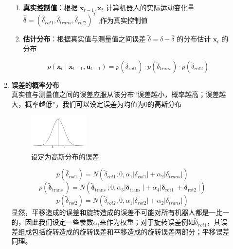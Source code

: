\documentclass[../main.tex]{subfiles}
\begin{document}
\begin{enumerate}
\begin{enumerate}
\begin{enumerate}
                \item \textbf{真实控制值}：根据 \( {\mathbf{x}}_{t - 1},{\mathbf{x}}_{t} \) 计算机器人的实际运动变化量 \( \widehat{\mathbf{\delta }} = {\left( {\widehat{\delta }}_{rot1},{\widehat{\delta }}_{trans},{\widehat{\delta }}_{rot2}\right) }^{T} \) ,作为真实控制值           
                \item \textbf{估计分布}：根据真实值与测量值之间误差 \( \widetilde{\delta } = \delta  - \widehat{\delta } \) 的分布估计 \( {\mathbf{x}}_{t} \) 的分布
                
                $$ \boxed{p\left( {{\mathbf{x}}_{t} \mid  {\mathbf{x}}_{t - 1},{\mathbf{u}}_{t - 1}}\right)  = p\left( {\widetilde{\delta }}_{rot1}\right)  \cdot  p\left( {\widetilde{\delta }}_{trans}\right)  \cdot  p\left( {\widetilde{\delta }}_{rot2}\right)} $$
            \end{enumerate}

         \item \textbf{误差的概率分布}\\
         真实值与测量值之间的误差应服从该分布“误差越小，概率越高；误差越大，概率越低”，我们可以设定误差为均值为0的高斯分布
            \begin{figure}[H]
                \centering
                \includegraphics[width=0.3\textwidth]{images/guass.png}
                \caption{设定为高斯分布的误差}
            \end{figure}
            $$ p( \widehat{\delta }_{rot1})  = N\left( {{\widetilde{\delta }}_{{rot}1};0,{\alpha }_{1}\left| {\delta }_{{rot}1}\right|  + {\alpha }_{2}\left| {\delta }_{trans}\right| }\right) $$
            $$ p\left( {\widetilde{\mathbf{\delta }}}_{\text{trans }}\right)  = N\left( {{\widetilde{\mathbf{\delta }}}_{\text{trans }};0,{\alpha }_{3}\left| {\mathbf{\delta }}_{\text{trans }}\right|  + {\alpha }_{4}\left| {{\mathbf{\delta }}_{\text{rot1 }} + {\mathbf{\delta }}_{\text{rot2 }}}\right| }\right) $$
            $$ p\left( {\widetilde{\delta }}_{rot2}\right)  = N\left( {{\widetilde{\delta }}_{rot2};0,{\alpha }_{1}\left| {\delta }_{rot2}\right|  + {\alpha }_{2}\left| {\delta }_{trans}\right| }\right) $$
                        {\small\kaishu 
            显然，平移造成的误差和旋转造成的误差不可能对所有机器人都是一比一的，因此我们设定一些参数$\alpha_i$来作为权重；对于旋转误差例如${\widetilde{\delta }}_{{rot}1}$，其误差组成包括旋转造成的旋转误差和平移造成的旋转误差两部分；平移误差同理。
            }


\end{enumerate}
\end{enumerate}
\end{document}

